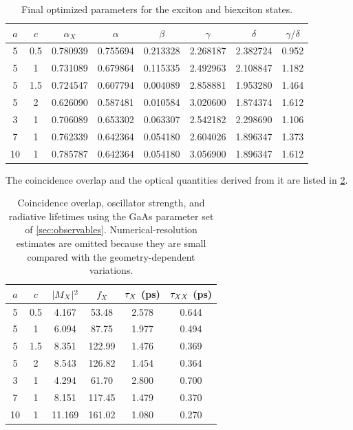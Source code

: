 \begin{table}[ht]
\centering
\caption{Final optimized parameters for the exciton and biexciton states.}
\label{tab:parameters}
\small
\begin{tabular}{cccccccc}
\toprule
$a$ & $c$ & $\alpha_X$ & $\alpha$ & $\beta$ & $\gamma$ & $\delta$ &
$\gamma/\delta$\\
\midrule
5 & 0.5 & 0.780939 & 0.755694 & 0.213328 & 2.268187 & 2.382724 & 0.952\\
5 & 1   & 0.731089 & 0.679864 & 0.115335 & 2.492963 & 2.108847 & 1.182\\
5 & 1.5 & 0.724547 & 0.607794 & 0.004089 & 2.858881 & 1.953280 & 1.464\\
5 & 2   & 0.626090 & 0.587481 & 0.010584 & 3.020600 & 1.874374 & 1.612\\
3 & 1   & 0.706089 & 0.653302 & 0.063307 & 2.542182 & 2.298690 & 1.106\\
7 & 1   & 0.762339 & 0.642364 & 0.054180 & 2.604026 & 1.896347 & 1.373\\
10 & 1  & 0.785787 & 0.642364 & 0.054180 & 3.056900 & 1.896347 & 1.612\\
\bottomrule
\end{tabular}
\end{table}

The coincidence overlap and the optical quantities derived from it are listed
in \cref{tab:optical}.

\begin{table}[ht]
\centering
\caption{Coincidence overlap, oscillator strength, and radiative lifetimes
using the GaAs parameter set of \cref{sec:observables}. Numerical-resolution
estimates are omitted because they are small compared with the
geometry-dependent variations.}
\label{tab:optical}
\small
\begin{tabular}{cccccc}
\toprule
$a$ & $c$ & $|M_X|^2$ & $f_X$ & $\tau_X$ (ps) & $\tau_{XX}$ (ps)\\
\midrule
5 & 0.5 & 4.167 & 53.48 & 2.578 & 0.644\\
5 & 1   & 6.094 & 87.75 & 1.977 & 0.494\\
5 & 1.5 & 8.351 & 122.99 & 1.476 & 0.369\\
5 & 2   & 8.543 & 126.82 & 1.454 & 0.364\\
3 & 1   & 4.294 & 61.70 & 2.800 & 0.700\\
7 & 1   & 8.151 & 117.45 & 1.479 & 0.370\\
10 & 1  & 11.169 & 161.02 & 1.080 & 0.270\\
\bottomrule
\end{tabular}
\end{table}
